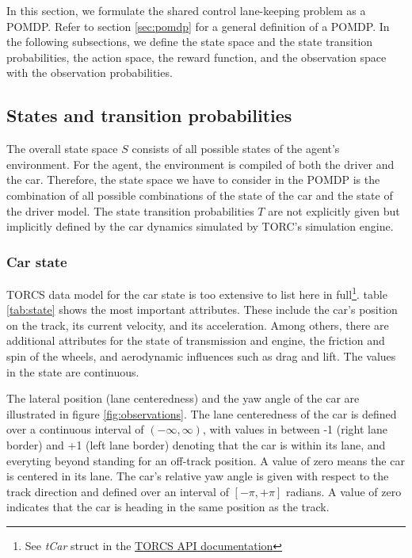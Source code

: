 In this section, we formulate the shared control lane-keeping problem as a POMDP. Refer to section \ref{sec:pomdp} for a general definition of a POMDP. In the following subsections, we define the state space and the state transition probabilities, the action space, the reward function, and the observation space with the observation probabilities. 

\subsection{States and transition probabilities}

The overall state space $S$ consists of all possible states of the agent's environment. For the agent, the environment is compiled of both the driver and the car. Therefore, the state space we have to consider in the POMDP is the combination of all possible combinations of the state of the car and the state of the driver model. The state transition probabilities $T$ are not explicitly given but implicitly defined by the car dynamics simulated by TORC's simulation engine.

\subsubsection*{Car state}
\label{sec:state}

TORCS data model for the car state is too extensive to list here in full\footnote{See \emph{tCar} struct in the \href{https://sourceforge.net/projects/torcs/files/api-docs/}{TORCS API documentation}}. table \ref{tab:state} shows the most important attributes. These include the car's position on the track, its current velocity, and its acceleration. Among others, there are additional attributes for the state of transmission and engine, the friction and spin of the wheels, and aerodynamic influences such as drag and lift. The values in the state are continuous. 



\noindent
The lateral position (lane centeredness) and the yaw angle of the car are illustrated in figure \ref{fig:observations}. The lane centeredness of the car is defined over a continuous interval of $(-\infty,\infty)$, with values in between -1 (right lane border) and +1 (left lane border) denoting that the car is within its lane, and everyting beyond standing for an off-track position. A value of zero means the car is centered in its lane. The car's relative yaw angle is given with respect to the track direction and defined over an interval of $[-\pi, +\pi]$ radians. A value of zero indicates that the car is heading in the same position as the track.

